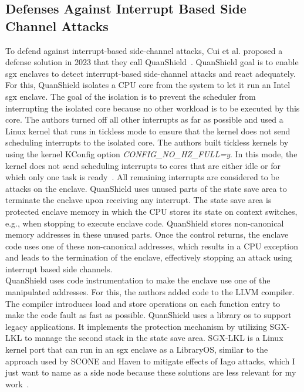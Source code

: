 \subsection{Defenses Against Interrupt Based Side Channel Attacks}
\label{sec:20:mitigations:interrupt_sca}
To defend against interrupt-based side-channel attacks, Cui et al. proposed a
defense solution in 2023 that they call QuanShield~\cite{cui_quanshield_2023}.
QuanShield goal is to enable \gls{sgx} enclaves to detect interrupt-based
side-channel attacks and react adequately. For this, QuanShield isolates a CPU
core from the system to let it run an Intel \gls{sgx} enclave. The goal of the
isolation is to prevent the scheduler from interrupting the isolated core
because no other workload is to be executed by this core. The authors turned off
all other interrupts as far as possible and used a Linux kernel that runs in
tickless mode to ensure that the kernel does not send scheduling interrupts to
the isolated core. The authors built tickless kernels by using the kernel
KConfig option \textit{CONFIG\_NO\_HZ\_FULL=y}. In this mode, the kernel does
not send scheduling interrupts to cores that are either idle or for which only
one task is ready~\cite{linuxtickless}. All remaining interrupts are considered
to be attacks on the enclave. QuanShield uses unused parts of the state save
area to terminate the enclave upon receiving any interrupt. The state save area
is protected enclave memory in which the CPU stores its state on context
switches, e.g., when stopping to execute enclave code. QuanShield stores
non-canonical memory addresses in these unused parts. Once the control returns,
the enclave code uses one of these non-canonical addresses, which results in a
CPU exception and leads to the termination of the enclave, effectively stopping
an attack using interrupt based side channels.\\

QuanShield uses code instrumentation to make the enclave use one of the
manipulated addresses. For this, the authors added code to the LLVM compiler.
The compiler introduces load and store operations on each function entry to make
the code fault as fast as possible. QuanShield uses a library \gls{os} to
support legacy applications. It implements the protection mechanism by utilizing
SGX-LKL to manage the second stack in the state save area. SGX-LKL is a Linux
kernel port that can run in an \gls{sgx} enclave as a LibraryOS, similar to the
approach used by SCONE and Haven to mitigate effects of Iago attacks, which I
just want to name as a side node because these solutions are less relevant for
my work~\cite{priebe2019sgx,arnautov_scone_2016,baumann_shielding_2015,
checkoway2013iago}.

